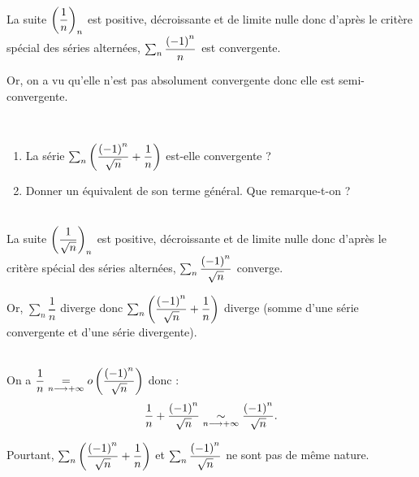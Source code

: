 \begin{dem}~\\
La suite \(\left(\dfrac{1}{n}\right)_n\) est positive, décroissante et de limite nulle donc d'après le critère spécial des séries alternées, \(\sum_n\dfrac{\left(-1\right)^n}{n}\) est convergente.

Or, on a vu qu'elle n'est pas absolument convergente donc elle est semi-convergente.
\end{dem}

\begin{exoex}~\\
\begin{enumerate}
    \item La série \(\sum_n\left(\dfrac{\left(-1\right)^n}{\sqrt{n}}+\dfrac{1}{n}\right)\) est-elle convergente ? \\
    \item Donner un équivalent de son terme général. Que remarque-t-on ?
\end{enumerate}
\end{exoex}

\begin{corr}[1]~\\
La suite \(\left(\dfrac{1}{\sqrt{n}}\right)_n\) est positive, décroissante et de limite nulle donc d'après le critère spécial des séries alternées, \(\sum_n\dfrac{\left(-1\right)^n}{\sqrt{n}}\) converge.

Or, \(\sum_n\dfrac{1}{n}\) diverge donc \(\sum_n\left(\dfrac{\left(-1\right)^n}{\sqrt{n}}+\dfrac{1}{n}\right)\) diverge (somme d'une série convergente et d'une série divergente).
\end{corr}

\begin{corr}[2]~\\
On a \(\dfrac{1}{n}\underset{n\longrightarrow+\infty}{=}o\left(\dfrac{\left(-1\right)^n}{\sqrt{n}}\right)\) donc : \[\dfrac{1}{n}+\dfrac{\left(-1\right)^n}{\sqrt{n}}\underset{n\longrightarrow+\infty}{\sim}\dfrac{\left(-1\right)^n}{\sqrt{n}}.\]

Pourtant, \(\sum_n\left(\dfrac{\left(-1\right)^n}{\sqrt{n}}+\dfrac{1}{n}\right)\) et \(\sum_n\dfrac{\left(-1\right)^n}{\sqrt{n}}\) ne sont pas de même nature.
\end{corr}